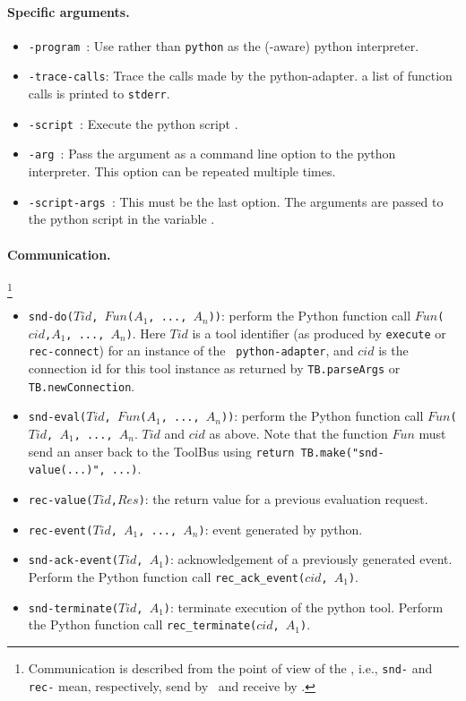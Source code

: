 \paragraph{Specific arguments.}
\begin{itemize}
\item {\tt -program }: Use  rather than {\tt python} as the
(\TB -aware) python interpreter.
\item {\tt -trace-calls}: Trace the calls made by the python-adapter.
      a list of function calls is printed to {\tt stderr}.
\item {\tt -script }: Execute the python script .
\item {\tt -arg }: Pass the argument  as a command line option
to the python interpreter. This option can be repeated multiple times.
\item {\tt -script-args }: This must be the last option.
The arguments  are passed to the python script in the
variable .
\end{itemize}

\paragraph{Communication.} \hspace{-0.3cm}\footnote{Communication is described
from the point of view of the \TB, i.e., {\tt snd-} and {\tt rec-}
mean, respectively, send by \TB\ and receive by \TB.}

\begin{itemize}
\item {\tt snd-do($Tid$, $Fun$($A_1$, ..., $A_n$))}: perform the Python
function call
{\tt $Fun$($cid$,$A_1$, ..., $A_n$)}. Here $Tid$ is a tool identifier
(as produced by {\tt execute} or {\tt rec-connect}) for an instance of the {\tt
python-adapter}, and $cid$ is the connection id for this tool instance 
as returned by {\tt TB.parseArgs} or {\tt TB.newConnection}.
\item {\tt snd-eval($Tid$, $Fun$($A_1$, ..., $A_n$))}: perform the Python
function call
{\tt $Fun$($Tid$, $A_1$, ..., $A_n$}. $Tid$ and $cid$ as above.
Note that the function {\tt $Fun$} must send an anser back to the
ToolBus using {\tt return TB.make("snd-value(...)", ...)}.
\item {\tt rec-value($Tid$,$Res$)}: the return value for a previous evaluation request.
\item {\tt rec-event($Tid$, $A_1$, ..., $A_n$)}: event generated by python.
\item {\tt snd-ack-event($Tid$, $A_1$)}: acknowledgement of
a previously generated event. Perform the Python function call
{\tt rec\_ack\_event($cid$, $A_1$)}.
\item {\tt snd-terminate($Tid$, $A_1$)}: terminate execution of the
python tool. Perform the Python function call
{\tt rec\_terminate($cid$, $A_1$)}.
\end{itemize}


